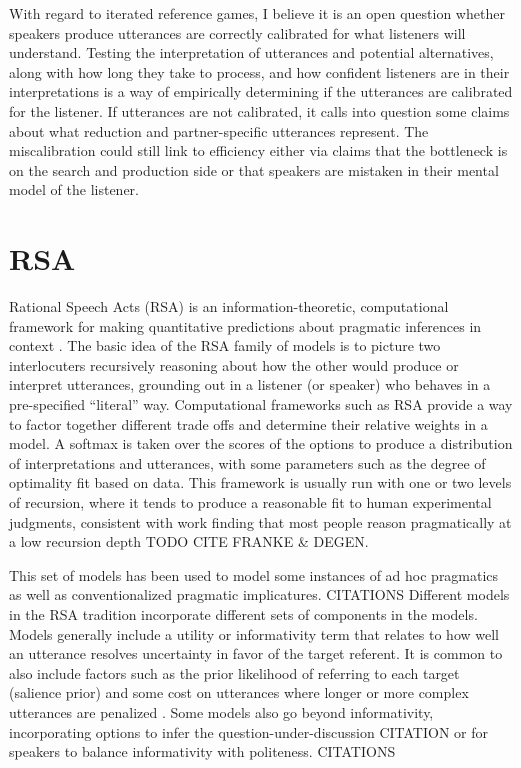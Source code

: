 \documentclass[]{article}
\begin{document}
With regard to iterated reference games, I believe it is an open question whether speakers produce utterances are correctly calibrated for what listeners will understand. Testing the interpretation of utterances and potential alternatives, along with how long they take to process, and how confident listeners are in their interpretations is a way of empirically determining if the utterances are calibrated for the listener. If utterances are not calibrated, it calls into question some claims about what reduction and partner-specific utterances represent. The miscalibration could still link to efficiency either via claims that the bottleneck is on the search and production side or that speakers are mistaken in their mental model of the listener. 


\section{RSA}

Rational Speech Acts (RSA) is an information-theoretic, computational framework for making quantitative predictions about pragmatic inferences in context \cite{goodman2016, frank2012a}. The basic idea of the RSA family of models is to picture two interlocuters recursively reasoning about how the other would produce or interpret utterances, grounding out in a listener (or speaker) who behaves in a pre-specified ``literal'' way. Computational frameworks such as RSA provide a way to factor together different trade offs and determine their relative weights in a model. A softmax is taken over the scores of the options to produce a distribution of interpretations and utterances, with some parameters such as the degree of optimality fit based on data.  
This framework is usually run with one or two levels of recursion, where it tends to produce a reasonable fit to human experimental judgments, consistent with work finding that most people reason pragmatically at a low recursion depth TODO CITE FRANKE \& DEGEN. 

This set of models has been used to model some instances of ad hoc pragmatics as well as conventionalized pragmatic implicatures. CITATIONS
Different models in the RSA tradition incorporate different sets of components in the models. Models generally include a utility or informativity term that relates to how well an utterance resolves uncertainty in favor of the target referent.  It is common to also include factors such as the prior likelihood of referring to each target (salience prior) and some cost on utterances where longer or more complex utterances are penalized \cite{goodman2016}. Some models also go beyond informativity, incorporating options to infer the question-under-discussion CITATION or for speakers to balance informativity with politeness. CITATIONS
\end{document}
